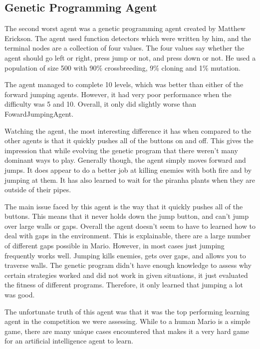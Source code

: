 \documentclass[12pt]{article}
\begin{document}
\begin{multicols*}{2}
\subsection*{Genetic Programming Agent}
The second worst agent was a genetic programming agent created by Matthew Erickson.  
The agent used function detectors which were written by him, and the terminal nodes are a 
collection of four values.  The four values say whether the agent should go left or right, 
press jump or not, and press down or not.  He used a population of size 500 with 90\% 
crossbreeding, 9\% cloning and 1\% mutation.

The agent managed to complete 10 levels, which was better than either of the forward jumping 
agents.  However, it had very poor performance when the difficulty was 5 and 10.  Overall, it only 
did slightly worse than FowardJumpingAgent.

Watching the agent, the most interesting difference it has when compared to the other agents is 
that it quickly pushes all of the buttons on and off.  This gives the impression that while evolving 
the genetic program that there weren't many dominant ways to play.  Generally though, the agent 
simply moves forward and jumps.  It does appear to do a better job at killing enemies with both 
fire and by jumping at them.  It has also learned to wait for the piranha plants when they are outside 
of their pipes.

The main issue faced by this agent is the way that it quickly pushes all of the buttons.  This means that 
it never holds down the jump button, and can't jump over large walls or gaps.  Overall the agent 
doesn't seem to have to learned how to deal with gaps in the environment.  This is explainable, there 
are a large number of different gaps possible in Mario.  However, in most cases just jumping frequently 
works well.    Jumping kills enemies, gets over gaps, and allows you to traverse walls.  
The genetic program didn't have enough knowledge to assess why certain strategies 
worked and did not work in given situations, it just evaluated the fitness of different programs.  
Therefore, it only learned that jumping a lot was good.

The unfortunate truth of this agent was that it was the top performing learning agent in the competition 
we were assessing.  While to a human Mario is a simple game, there are many unique cases 
encountered that makes it a very hard game for an artificial intelligence agent to learn.

\end{multicols*}
\end{document}
